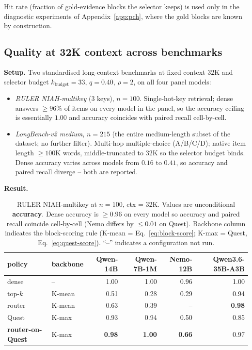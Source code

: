 \documentclass[11pt]{article}
\theoremstyle{remark}
\newcommand{\kbudget}{k_{\text{budget}}}
\begin{document}
Hit rate (fraction of gold-evidence blocks the selector keeps) is used only in the diagnostic experiments of Appendix~\ref{app:pch}, where the gold blocks are known by construction.

\subsection{Quality at 32K context across benchmarks}\label{sec:quality-32k}

\textbf{Setup.} Two standardised long-context benchmarks at fixed context $32$K and selector budget $\kbudget=33$, $q=0.40$, $\rho=2$, on all four panel models:
\begin{itemize}[leftmargin=*,topsep=0.2em,itemsep=0.1em]
    \item \emph{RULER NIAH-multikey} (3 keys), $n = 100$. Single-hot-key retrieval; dense answers $\geq 96\%$ of items on every model in the panel, so the accuracy ceiling is essentially $1.00$ and accuracy coincides with paired recall cell-by-cell.
    \item \emph{LongBench-v2 medium}, $n = 215$ (the entire medium-length subset of the dataset; no further filter). Multi-hop multiple-choice (A/B/C/D); native item length $\geq 100$K words, middle-truncated to $32$K so the selector budget binds. Dense accuracy varies across models from $0.16$ to $0.41$, so accuracy and paired recall diverge -- both are reported.
\end{itemize}

\textbf{Result.}

\begin{table}[h]
\centering\small
\caption{RULER NIAH-multikey at $n = 100$, ctx = 32K. Values are unconditional \textbf{accuracy}. Dense accuracy is $\ge 0.96$ on every model so accuracy and paired recall coincide cell-by-cell (Nemo differs by $\le 0.01$ on Quest). Backbone column indicates the block-scoring rule (K-mean = Eq.~\ref{eq:block-score}; K-max = Quest, Eq.~\ref{eq:quest-score}). ``--'' indicates a configuration not run.}\label{tab:ruler}
\begin{tabular}{llrrrr}
\toprule
policy & backbone & Qwen-14B & Qwen-7B-1M & Nemo-12B & Qwen3.6-35B-A3B \\
\midrule
dense                       & --      & 1.00 & 1.00 & 0.96 & 1.00 \\
\midrule
top-$k$                     & K-mean  & 0.51 & 0.28 & 0.29 & 0.94 \\
router                      & K-mean  & 0.63 & 0.39 & --   & \textbf{0.98} \\
Quest                       & K-max   & 0.93 & 0.94 & 0.50 & 0.85 \\
\textbf{router-on-Quest}    & K-max   & \textbf{0.98} & \textbf{1.00} & \textbf{0.66} & 0.97 \\
\bottomrule
\end{tabular}
\end{table}
\end{document}
